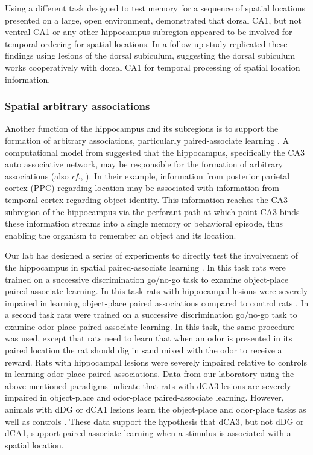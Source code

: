 \documentclass[doc, longtable]{apa6}
\begin{document}
Using a different task designed to test memory for a sequence of spatial locations presented on a large, open environment, \cite{Hunsaker2008h, Hunsaker2008g} demonstrated that dorsal CA1, but not ventral CA1 or any other hippocampus subregion appeared to be involved for temporal ordering for spatial locations. In a follow up study \cite{Potvin2010a} replicated these findings using lesions of the dorsal subiculum, suggesting the dorsal subiculum works cooperatively with dorsal CA1 for temporal processing of spatial location information. 

\subsubsection{Spatial arbitrary associations}
Another function of the hippocampus and its subregions is to support the formation of arbitrary associations, particularly paired-associate learning \parencite{Eichenbaum1993b, OKeefe1978a}. A computational model from \textcite{Rolls1996a} suggested that the hippocampus, specifically the CA3 auto associative network, may be responsible for the formation of arbitrary associations (also \textit{cf.}, \cite{OReilly2001a}). In their example, information from posterior parietal cortex (PPC) regarding location may be associated with information from temporal cortex regarding object identity. This information reaches the  CA3 subregion of the hippocampus via the perforant path at which point CA3 binds these information streams into a single memory or behavioral episode, thus enabling the organism to remember an object and its location.

Our lab has designed a series of experiments to directly test the involvement of the hippocampus in spatial paired-associate learning \parencite{Gilbert2002a, Gilbert2003b}. In this task rats were trained on a successive discrimination go/no-go task to examine object-place paired associate learning. In this task rats with hippocampal lesions were severely impaired in learning object-place paired associations compared to control rats \parencite{Gilbert2002a}. In a second task rats were trained on a successive discrimination go/no-go task to examine odor-place paired-associate learning. In this task, the same procedure was used, except that rats need to learn that when an odor is presented in its paired location the rat should dig in sand mixed with the odor to receive a reward. Rats with hippocampal lesions were severely impaired relative to controls in learning odor-place paired-associations. Data from our laboratory using the above mentioned paradigms indicate that rats with dCA3 lesions are severely impaired in object-place and odor-place paired-associate learning. However, animals with dDG or dCA1 lesions learn the object-place and odor-place tasks as well as controls \parencite{Gilbert2003b}. These data support the hypothesis that dCA3, but not dDG or dCA1, support paired-associate learning when a stimulus is associated with a spatial location.
\end{document}
